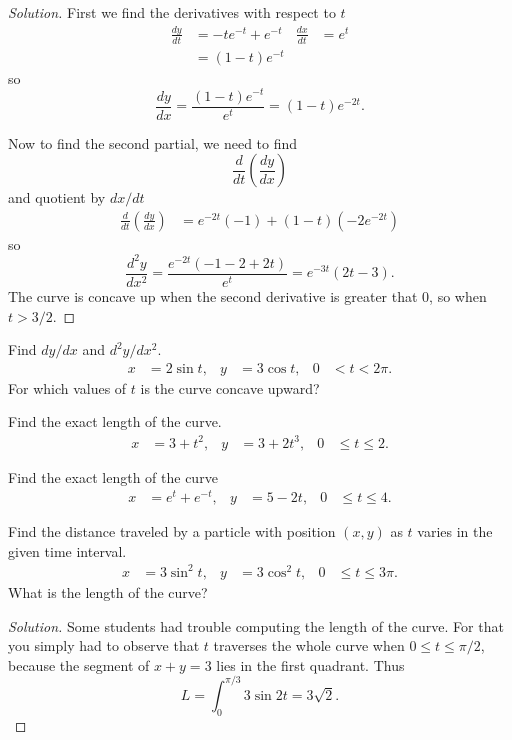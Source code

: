 \begin{proof}[Solution]
First we find the derivatives with respect to $t$
\[
  \begin{aligned}
    \frac{dy}{dt}&=-te^{-t}+e^{-t}&\frac{dx}{dt}&=e^t\\
    &=(1-t)e^{-t}
  \end{aligned}
\]
so
\[
\frac{dy}{dx}=\frac{(1-t)e^{-t}}{e^t}=(1-t)e^{-2t}.
\]

Now to find the second partial, we need to find
\[
\frac{d}{dt}\left(\frac{dy}{dx}\right)
\]
and quotient by $dx/dt$
\[
  \begin{aligned}
    \frac{d}{dt}\left(\frac{dy}{dx}\right)&=e^{-2t}(-1)+(1-t)(-2e^{-2t})
  \end{aligned}
\]
so
\[
  \frac{d^2 y}{dx^2}=\frac{e^{-2t}(-1-2+2t)}{e^t}=e^{-3t}(2t-3).
\]
The curve is concave up when the second derivative is greater that $0$, so
when $t>3/2$.
\end{proof}
\begin{problem}[WebAssign HW 32, \# 5]
Find $dy/dx$ and $d^2y/dx^2$.
\[
  \begin{aligned}
    x&=2\sin t,&y&=3\cos t,&0&<t<2\pi.
  \end{aligned}
\]
For which values of $t$ is the curve concave upward?
\end{problem}
\begin{problem}[WebAssign HW 32, \# 6]
Find the exact length of the curve.
\[
  \begin{aligned}
    x&=3+t^2,&y&=3+2t^3,&0&\leq t\leq 2.
  \end{aligned}
\]
\end{problem}
\begin{problem}[WebAssign HW 32, \# 7]
Find the exact length of the curve
\[
  \begin{aligned}
    x&=e^t+e^{-t},&y&=5-2t,&0&\leq t\leq 4.
  \end{aligned}
\]
\end{problem}
\begin{problem}[WebAssign HW 32, \# 8]
Find the distance traveled by a particle with position $(x,y)$ as $t$
varies in the given time interval.
\[
  \begin{aligned}
    x&=3\sin^2 t,&y&=3\cos^2 t,&0&\leq t\leq 3\pi.
  \end{aligned}
\]
What is the length of the curve?
\end{problem}
\begin{proof}[Solution]
Some students had trouble computing the length of the curve. For that you
simply had to observe that $t$ traverses the whole curve when $0\leq
t\leq\pi/2$, because the segment of $x+y=3$ lies in the first
quadrant. Thus
\[
L=\int_0^{\pi/3} 3\sin 2t=3\sqrt{2}.
\]
\end{proof}
